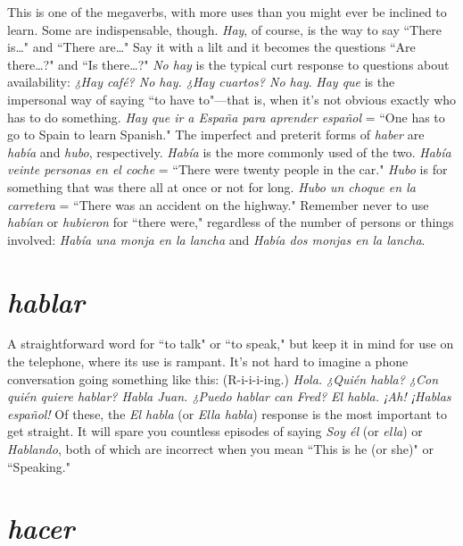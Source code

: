This is one of the megaverbs, with more uses than you might
ever be inclined to learn. Some are indispensable, though. \emph{Hay}, of
course, is the way to say ``There is\ldots{}" and ``There are\ldots{}" Say it
with a lilt and it becomes the questions ``Are there\ldots{}?" and ``Is
there\ldots{}?" \emph{No hay} is the typical curt response to questions about
availability: \emph{¿Hay café? No hay. ¿Hay cuartos? No hay}. \emph{Hay que} is the
impersonal way of saying ``to have to"---that is, when it's not obvious
exactly who has to do something. \emph{Hay que ir a España para aprender
	español} = ``One has to go to Spain to learn Spanish." The imperfect
and preterit forms of \emph{haber} are \emph{había} and \emph{hubo}, respectively. \emph{Había}
is the more commonly used of the two. \emph{Había veinte personas en el
	coche} = ``There were twenty people in the car." \emph{Hubo} is for something that was there all at once or not for long. \emph{Hubo un choque en la
	carretera} = ``There was an accident on the highway." Remember never
to use \emph{habían} or \emph{hubieron} for ``there were," regardless of the number
of persons or things involved: \emph{Había una monja en la lancha} and \emph{Había dos monjas en la lancha}.

\section{\emph{hablar}}

A straightforward word for ``to talk" or ``to speak," but keep
it in mind for use on the telephone, where its use is rampant. It's not
hard to imagine a phone conversation going something like this:
(R-i-i-i-ing.) \emph{Hola. ¿Quién habla? ¿Con quién quiere hablar? Habla
	Juan. ¿Puedo hablar can Fred? El habla. ¡Ah! ¡Hablas español!} Of
these, the \emph{El habla} (or \emph{Ella habla}) response is the most important to
get straight. It will spare you countless episodes of saying \emph{Soy él} (or
\emph{ella}) or \emph{Hablando}, both of which are incorrect when you mean ``This
is he (or she)" or ``Speaking."

\section{\emph{hacer}}

